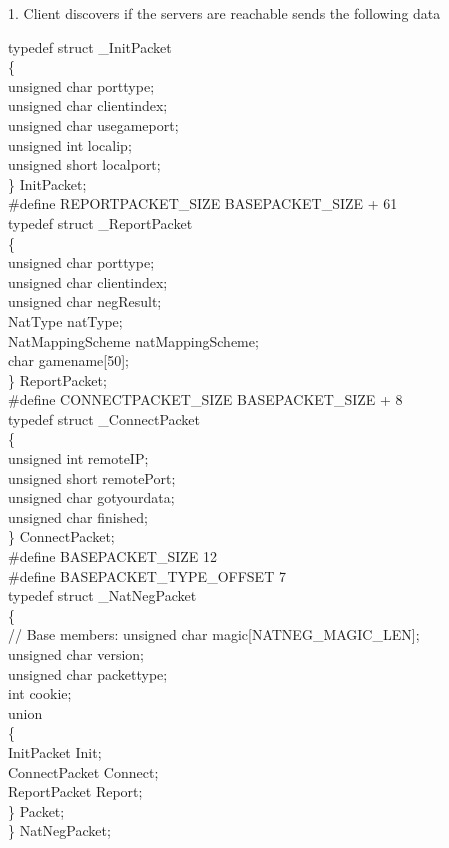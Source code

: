\documentclass[oneside,titlepage,a4paper]{Definition/retrospy} %
\begin{document}
1. Client discovers if the servers are reachable
sends the following data

\begin{tcolorbox}
typedef struct \_InitPacket\\
\{\\
	unsigned char porttype;\\
	unsigned char clientindex;\\
	unsigned char usegameport;\\
	unsigned int localip;\\
	unsigned short localport;\\
\} InitPacket;\\

\#define REPORTPACKET\_SIZE BASEPACKET\_SIZE + 61\\
typedef struct \_ReportPacket\\
\{\\
	unsigned char porttype;\\
	unsigned char clientindex;\\
	unsigned char negResult;\\
	NatType natType;\\
	NatMappingScheme natMappingScheme;\\
	char gamename[50];\\
\} ReportPacket;\\

\#define CONNECTPACKET\_SIZE BASEPACKET\_SIZE + 8\\
typedef struct \_ConnectPacket\\
\{\\
	unsigned int remoteIP;\\
	unsigned short remotePort;\\
	unsigned char gotyourdata;\\
	unsigned char finished;\\
\} ConnectPacket;\\

\#define BASEPACKET\_SIZE 12\\
\#define BASEPACKET\_TYPE\_OFFSET 7\\
typedef struct \_NatNegPacket \\
\{\\
	// Base members:
	unsigned char magic[NATNEG\_MAGIC\_LEN];\\
	unsigned char version;\\
	unsigned char packettype;\\
	int cookie;	\\
	
	union \\
	\{\\
		InitPacket Init;\\
		ConnectPacket Connect;\\
		ReportPacket Report;\\
	\} Packet;\\
	
\} NatNegPacket;


\end{tcolorbox}
\end{document}
